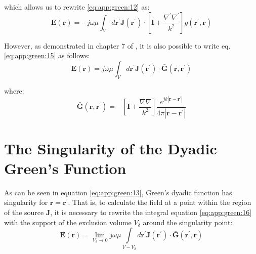 			\noindent which allows us to rewrite \eqref{eq:app:green:12} as:
			\begin{equation}
				\mathbf{E}(\mathbf{r}) = -j\omega\mu\int_V d\mathbf{r^\prime} \mathbf{J}(\mathbf{r^\prime})\cdot\left[\mathbf{\bar{I}}+\frac{\nabla^\prime\nabla^\prime}{k^2}\right]g(\mathbf{r^\prime},\mathbf{r}) \label{eq:app:green:15}
			\end{equation}
		
			However, as demonstrated in chapter 7 of \citep{chew1995}, it is also possible to write eq.\eqref{eq:app:green:15} as follows:
			\begin{equation}
				\mathbf{E}(\mathbf{r}) = j\omega\mu\int_V d\mathbf{r^\prime} \mathbf{J}(\mathbf{r^\prime})\cdot\mathbf{\bar{G}}(\mathbf{r},\mathbf{r^\prime}) \label{eq:app:green:16}
			\end{equation}
		
			\noindent where:
			\begin{equation}
				\mathbf{\bar{G}}(\mathbf{r},\mathbf{r^\prime}) = -\left[\mathbf{\bar{I}}+\frac{\nabla\nabla}{k^2}\right]\frac{e^{jk|\mathbf{\mathbf{r}-\mathbf{r^\prime}}|}}{4\pi|\mathbf{\mathbf{r}-\mathbf{r^\prime}}|} \label{eq:app:green:17}
			\end{equation}
		
		\section{The Singularity of the Dyadic Green's Function}\label{app:green:2}
		
			As can be seen in equation \eqref{eq:app:green:13}, Green's dyadic function has singularity for $\mathbf{r}=\mathbf{r^\prime}$. That is, to calculate the field at a point within the region of the source $\mathbf{J}$, it is necessary to rewrite the integral equation \eqref{eq:app:green:16} with the support of the exclusion volume $V_\delta$ around the singularity point:
			\begin{equation}
				\mathbf{E}(\mathbf{r}) = \lim\limits_{V_\delta\rightarrow0} j\omega\mu\int\limits_{V-V_\delta} d\mathbf{r^\prime} \mathbf{J}(\mathbf{r^\prime})\cdot\mathbf{\bar{G}}(\mathbf{r^\prime},\mathbf{r}) \label{eq:app:green:18}
			\end{equation}
		
